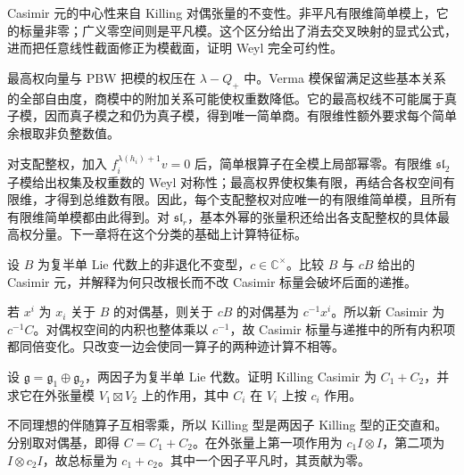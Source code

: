 \begin{chaptersummary}
	Casimir 元的中心性来自 Killing 对偶张量的不变性。非平凡有限维简单模上，它的标量非零；广义零空间则是平凡模。这个区分给出了消去交叉映射的显式公式，进而把任意线性截面修正为模截面，证明 Weyl 完全可约性。

	\ProseParagraphBreak
	最高权向量与 PBW 把模的权压在 \(\lambda-Q_+\) 中。Verma 模保留满足这些基本关系的全部自由度，商模中的附加关系可能使权重数降低。它的最高权线不可能属于真子模，因而真子模之和仍为真子模，得到唯一简单商。有限维性额外要求每个简单余根取非负整数值。

	\ProseParagraphBreak
	对支配整权，加入 \(f_i^{\lambda(h_i)+1}v=0\) 后，简单根算子在全模上局部幂零。有限维 \(\mathfrak{sl}_2\) 子模给出权集及权重数的 Weyl 对称性；最高权界使权集有限，再结合各权空间有限维，才得到总维数有限。因此，每个支配整权对应唯一的有限维简单模，且所有有限维简单模都由此得到。对 \(\mathfrak{sl}_r\)，基本外幂的张量积还给出各支配整权的具体最高权分量。下一章将在这个分类的基础上计算特征标。
\end{chaptersummary}

\BookExercises

\begin{exercise}\label{b5:ex:18-casimir-rescaling}
	设 \(B\) 为复半单 Lie 代数上的非退化不变型，\(c\in\mathbb C^\times\)。比较 \(B\) 与 \(cB\) 给出的 Casimir 元，并解释为何只改根长而不改 Casimir 标量会破坏后面的递推。
\end{exercise}
\begin{solution}
	若 \(x^i\) 为 \(x_i\) 关于 \(B\) 的对偶基，则关于 \(cB\) 的对偶基为 \(c^{-1}x^i\)。所以新 Casimir 为 \(c^{-1}C\)。对偶权空间的内积也整体乘以 \(c^{-1}\)，故 Casimir 标量与递推中的所有内积项都同倍变化。只改变一边会使同一算子的两种迹计算不相等。
\end{solution}

\begin{exercise}\label{b5:ex:18-casimir-direct-sum}
	设 \(\mathfrak g=\mathfrak g_1\oplus\mathfrak g_2\)，两因子为复半单 Lie 代数。证明 Killing Casimir 为 \(C_1+C_2\)，并求它在外张量模 \(V_1\boxtimes V_2\) 上的作用，其中 \(C_i\) 在 \(V_i\) 上按 \(c_i\) 作用。
\end{exercise}
\begin{solution}
	不同理想的伴随算子互相零乘，所以 Killing 型是两因子 Killing 型的正交直和。分别取对偶基，即得 \(C=C_1+C_2\)。在外张量上第一项作用为 \(c_1I\otimes I\)，第二项为 \(I\otimes c_2I\)，故总标量为 \(c_1+c_2\)。其中一个因子平凡时，其贡献为零。
\end{solution}

